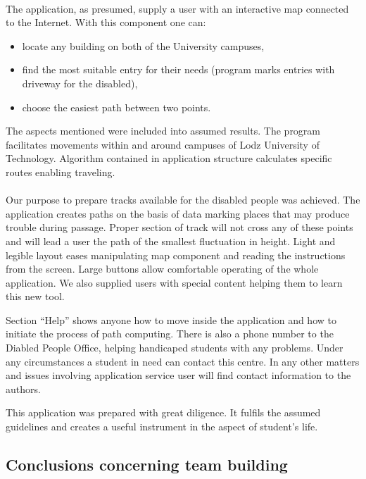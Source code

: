\documentclass[12pt]{article}
\begin{document}
\paragraph{}
The application, as presumed, supply a user with an interactive map connected to the Internet.
With this component one can:
\begin{itemize}
	\item locate any building on both of the University campuses,
	\item find the most suitable entry for their needs (program marks entries with driveway for the disabled),
	\item choose the easiest path between two points.
\end{itemize}
The aspects mentioned were included into assumed results.
The program facilitates movements within and around campuses of Lodz University of Technology.
Algorithm contained in application structure calculates specific routes enabling traveling.

\paragraph{}
Our purpose to prepare tracks available for the disabled people was achieved.
The application creates paths on the basis of data marking places that may produce trouble during passage.
Proper section of track will not cross any of these points and will lead a user the path of the smallest fluctuation in height.
Light and legible layout eases manipulating map component and reading the instructions from the screen.
Large buttons allow comfortable operating of the whole application.
We also supplied users with special content helping them to learn this new tool.

Section ``Help'' shows anyone how to move inside the application and how to initiate the process of path computing.
There is also a phone number to the Diabled People Office, helping handicaped students with any problems.
Under any circumstances a student in need can contact this centre.
In any other matters and issues involving application service user will find contact information to the authors.

This application was prepared with great diligence.
It fulfils the assumed guidelines and creates a useful instrument in the aspect of student's life.

\subsection{Conclusions concerning team building}
\end{document}
